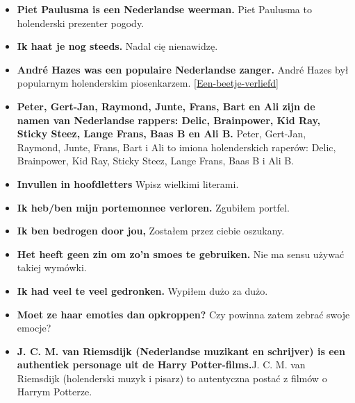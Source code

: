 \documentclass[
]{book}
\begin{document}
\begin{itemize}
\item
  \textbf{Piet Paulusma is een Nederlandse weerman.} Piet Paulusma to holenderski prezenter pogody.\\
\item
  \textbf{Ik haat je nog steeds.} Nadal cię nienawidzę.\\
\item
  \textbf{André Hazes was een populaire Nederlandse zanger.} André Hazes był popularnym holenderskim piosenkarzem. \ref{Een-beetje-verliefd}\\
\item
  \textbf{Peter, Gert-Jan, Raymond, Junte, Frans, Bart en Ali zijn de namen van Nederlandse rappers: Delic, Brainpower, Kid Ray, Sticky Steez, Lange Frans, Baas B en Ali B.} Peter, Gert-Jan, Raymond, Junte, Frans, Bart i Ali to imiona holenderskich raperów: Delic, Brainpower, Kid Ray, Sticky Steez, Lange Frans, Baas B i Ali B.\\
\item
  \textbf{Invullen in hoofdletters} Wpisz wielkimi literami.\\
\item
  \textbf{Ik heb/ben mijn portemonnee verloren.} Zgubiłem portfel.\\
\item
  \textbf{Ik ben bedrogen door jou,} Zostałem przez ciebie oszukany.\\
\item
  \textbf{Het heeft geen zin om zo'n smoes te gebruiken.} Nie ma sensu używać takiej wymówki.\\
\item
  \textbf{Ik had veel te veel gedronken.} Wypiłem dużo za dużo.\\
\item
  \textbf{Moet ze haar emoties dan opkroppen?} Czy powinna zatem zebrać swoje emocje?\\
\item
  \textbf{J. C. M. van Riemsdijk (Nederlandse muzikant en schrijver) is een authentiek personage uit de Harry Potter-films.}J. C. M. van Riemsdijk (holenderski muzyk i pisarz) to autentyczna postać z filmów o Harrym Potterze.
\end{itemize}

  
\end{document}
